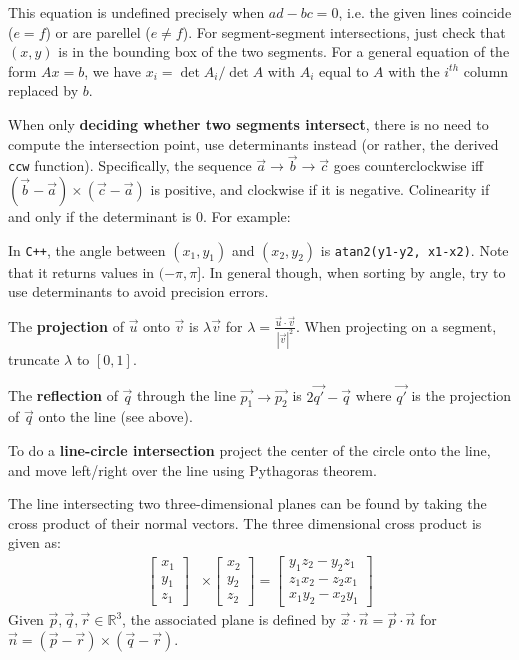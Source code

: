 \documentclass[
	a4paper,
	landscape,
	10pt,
	article
]{article}
\begin{document}
This equation is undefined precisely when $ad-bc = 0$, i.e. the given lines
coincide ($e=f$) or are parellel ($e \neq f$). For segment-segment
intersections, just check that $(x, y)$ is in the bounding box of the two
segments.
For a general equation of the form $Ax = b$, we have $x_i = \det A_i / \det A$
with $A_i$ equal to $A$ with the $i^{th}$ column replaced by $b$.

When only \textbf{deciding whether two segments intersect}, there is no need
to compute the intersection point, use determinants instead (or rather,
the derived \texttt{ccw} function). Specifically, the sequence $\vec{a}
	\to \vec{b} \to \vec{c}$ goes counterclockwise iff
$(\vec{b}-\vec{a})\times(\vec{c}-\vec{a})$ is positive, and clockwise if it
is negative. Colinearity if and only if the determinant is $0$. For example:



In \texttt{C++}, the angle between $(x_1, y_1)$ and $(x_2, y_2)$ is
\texttt{atan2(y1-y2, x1-x2)}. Note that it returns values in
$(-\pi, \pi]$. In general though, when sorting by angle, try to use
determinants to avoid precision errors.

The \textbf{projection} of $\vec{u}$ onto $\vec{v}$ is
$\lambda\vec{v}$ for $\lambda = \frac{\vec{u}\cdot\vec{v}}{|\vec{v}|^2}$.
When projecting on a segment, truncate $\lambda$ to $[0, 1]$.

The \textbf{reflection} of $\vec{q}$ through the line $\vec{p_1}\to\vec{p_2}$
is $2\vec{q'} - \vec{q}$ where $\vec{q'}$ is the projection of $\vec{q}$ onto
the line (see above).

To do a \textbf{line-circle intersection} project the center of the circle onto
the line, and move left/right over the line using Pythagoras theorem.

The line intersecting two three-dimensional planes can be found by taking the
cross product of their normal vectors. The three dimensional cross product is
given as:
$$\begin{aligned}
	\begin{bmatrix}
		x_1 \\ y_1 \\ z_1
	\end{bmatrix}
	&\times
	\begin{bmatrix}
		x_2 \\ y_2 \\ z_2
	\end{bmatrix}
	=
	\begin{bmatrix}
		y_1 z_2 - y_2 z_1 \\
		z_1 x_2 - z_2 x_1 \\
		x_1 y_2 - x_2 y_1
	\end{bmatrix}
\end{aligned}$$
Given $\vec{p}, \vec{q}, \vec{r} \in \mathbb{R}^3$, the associated plane
is defined by $\vec{x} \cdot \vec{n} = \vec{p}\cdot\vec{n}$ for
$\vec{n} =(\vec{p}-\vec{r})\times(\vec{q}-\vec{r})$.
\end{document}
